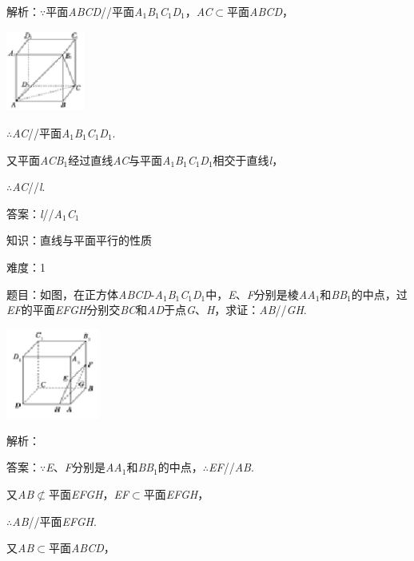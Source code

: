 \documentclass{article} %
\begin{document}
解析：$\mathrm{\because}$平面\textit{ABCD}//平面\textit{A}${}_{1}$\textit{B}${}_{1}$\textit{C}${}_{1}$\textit{D}${}_{1}$，\textit{AC}$\mathrm{\subset }$平面\textit{ABCD}，

\includegraphics*[width=1.02in, height=1.04in, keepaspectratio=false]{image164}

$\mathrm{\therefore}$\textit{AC}//平面\textit{A}${}_{1}$\textit{B}${}_{1}$\textit{C}${}_{1}$\textit{D}${}_{1}$.

又平面\textit{ACB}${}_{1}$经过直线\textit{AC}与平面\textit{A}${}_{1}$\textit{B}${}_{1}$\textit{C}${}_{1}$\textit{D}${}_{1}$相交于直线\textit{l}，

$\mathrm{\therefore}$\textit{AC}//\textit{l}.

答案：\textit{l}//\textit{A}${}_{1}$\textit{C}${}_{1}$

知识：直线与平面平行的性质

难度：1

题目：如图，在正方体\textit{ABCD}-\textit{A}${}_{1}$\textit{B}${}_{1}$\textit{C}${}_{1}$\textit{D}${}_{1}$中，\textit{E}、\textit{F}分别是棱\textit{AA}${}_{1}$和\textit{BB}${}_{1}$的中点，过\textit{EF}的平面\textit{EFGH}分别交\textit{BC}和\textit{AD}于点\textit{G}、\textit{H}，求证：\textit{AB}//\textit{GH}.

\includegraphics*[width=1.21in, height=1.16in, keepaspectratio=false]{image165}

解析：

答案：$\mathrm{\because}$\textit{E}、\textit{F}分别是\textit{AA}${}_{1}$和\textit{BB}${}_{1}$的中点，$\mathrm{\therefore}$\textit{EF}//\textit{AB}.

又\textit{AB}$\mathrm{\nsubset}$平面\textit{EFGH}，\textit{EF}$\mathrm{\subset }$平面\textit{EFGH}，

$\mathrm{\therefore}$\textit{AB}//平面\textit{EFGH}.

又\textit{AB}$\mathrm{\subset }$平面\textit{ABCD}，
\end{document}
